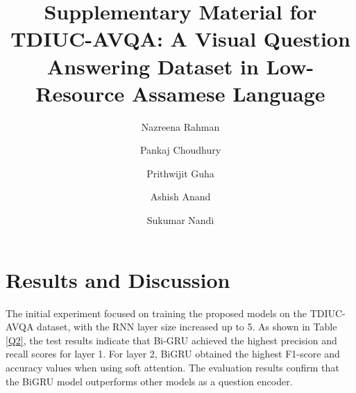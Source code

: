 \documentclass[runningheads]{llncs}
\begin{document}

\title{Supplementary Material for \\ TDIUC-AVQA: A Visual Question Answering Dataset in Low-Resource Assamese Language}



\author{Nazreena Rahman   \and Pankaj Choudhury   \and Prithwijit Guha   \and Ashish Anand    \and Sukumar   Nandi  }

%


\maketitle              %
%

%

\section{Results and Discussion}

The initial experiment focused on training the proposed models on the TDIUC-AVQA dataset, with the RNN layer size increased up to 5. As shown in Table \ref{Q2}, the test results indicate that Bi-GRU achieved the highest precision and recall scores for layer 1. For layer 2, BiGRU obtained the highest F1-score and accuracy values when using soft attention. The evaluation results confirm that the BiGRU model outperforms other models as a question encoder.
\end{document}

